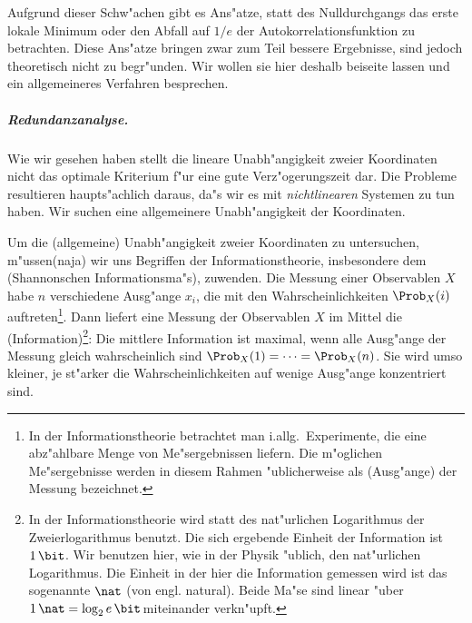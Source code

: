 Aufgrund dieser Schw"achen gibt es Ans"atze, statt des Nulldurchgangs das erste lokale
Minimum oder den Abfall auf $1/e$ der Autokorrelationsfunktion zu betrachten. Diese
Ans"atze bringen zwar zum Teil bessere Ergebnisse, sind jedoch theoretisch nicht zu
begr"unden. Wir wollen sie hier deshalb beiseite lassen und ein allgemeineres Verfahren
besprechen.

\subparagraph{Redundanzanalyse.}  Wie wir gesehen haben stellt die lineare
Un\-ab\-h"an\-gig\-keit zweier Koordinaten nicht das optimale Kriterium f"ur eine gute
Verz"ogerungszeit dar. Die Probleme resultieren haupts"achlich daraus, da"s wir es mit
\emph{nichtlinearen} Systemen zu tun haben. Wir suchen eine allgemeinere Unabh"angigkeit
der Koordinaten.


\comment{Sei $X$ eine beliebige Zufallsvariable und $\Prob_X(i)$ die Wahrscheinlichkeit
  bei einer Messung von $X$ einen Wert im Intervall $[x_i,x_{i+1}[$ zu erhalten. Dann
  betr"agt die mittlere Information einer Messung von $X$}

Um die \begriff(allgemeine) Unabh"angigkeit zweier Koordinaten zu untersuchen,
m"ussen\korrektur(naja) wir uns Begriffen der Informationstheorie, insbesondere dem
\begriff(Shannonschen Informationsma"s), zuwenden. Die Messung einer Observablen $X$ habe
$n$ verschiedene Ausg"ange $x_i$, die mit den Wahrscheinlichkeiten $\Prob_X(i)$
auftreten\footnote{In der Informationstheorie betrachtet man i.allg.\  Experimente, 
  die eine abz"ahlbare Menge von Me"sergebnissen liefern. Die m"oglichen Me"sergebnisse
  werden in diesem Rahmen "ublicherweise als \begriff(Ausg"ange) der Messung bezeichnet.}.
Dann liefert eine Messung der Observablen $X$ im Mittel die
\begriff(Information)\footnote{In der Informationstheorie wird statt des nat"urlichen
  Logarithmus der Zweierlogarithmus benutzt. Die sich ergebende Einheit der Information
  ist $1\,\bit$. Wir benutzen hier, wie in der Physik "ublich, den nat"urlichen
  Logarithmus. Die Einheit in der hier die Information gemessen wird ist das sogenannte
  $\nat$ (von engl. natural). Beide Ma"se sind linear "uber $1\,\nat =\log_2
  e\,\bit\,$miteinander verkn"upft.}:
Die
mittlere Information ist maximal, wenn alle Ausg"ange der Messung gleich wahrscheinlich
sind $\Prob_X(1)=\dots=\Prob_X(n)$. Sie wird umso kleiner, je st"arker die
Wahrscheinlichkeiten auf wenige Ausg"ange konzentriert sind.

